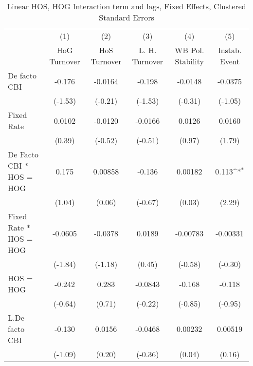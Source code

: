 {
\def\sym#1{\ifmmode^{#1}\else\(^{#1}\)\fi}
\begin{longtable}{l*{5}{c}}
\caption{Linear HOS, HOG Interaction term and lags, Fixed Effects, Clustered Standard Errors \label{hoshogintlagsDF}}\\
\hline\hline\endfirsthead\hline\endhead\hline\endfoot\endlastfoot
                &\multicolumn{1}{c}{(1)}&\multicolumn{1}{c}{(2)}&\multicolumn{1}{c}{(3)}&\multicolumn{1}{c}{(4)}&\multicolumn{1}{c}{(5)}\\
                &\multicolumn{1}{c}{HoG Turnover}&\multicolumn{1}{c}{HoS Turnover}&\multicolumn{1}{c}{L. H. Turnover}&\multicolumn{1}{c}{WB Pol. Stability}&\multicolumn{1}{c}{Instab. Event}\\
\hline
De facto CBI    &   -0.176         &  -0.0164         &   -0.198         &  -0.0148         &  -0.0375         \\
                &  (-1.53)         &  (-0.21)         &  (-1.53)         &  (-0.31)         &  (-1.05)         \\
[1em]
Fixed Rate      &   0.0102         &  -0.0120         &  -0.0166         &   0.0126         &   0.0160         \\
                &   (0.39)         &  (-0.52)         &  (-0.51)         &   (0.97)         &   (1.79)         \\
[1em]
De Facto CBI * HOS = HOG&    0.175         &  0.00858         &   -0.136         &  0.00182         &    0.113\sym{*}  \\
                &   (1.04)         &   (0.06)         &  (-0.67)         &   (0.03)         &   (2.29)         \\
[1em]
Fixed Rate * HOS = HOG&  -0.0605         &  -0.0378         &   0.0189         & -0.00783         & -0.00331         \\
                &  (-1.84)         &  (-1.18)         &   (0.45)         &  (-0.58)         &  (-0.30)         \\
[1em]
HOS = HOG       &   -0.242         &    0.283         &  -0.0843         &   -0.168         &   -0.118         \\
                &  (-0.64)         &   (0.71)         &  (-0.22)         &  (-0.85)         &  (-0.95)         \\
[1em]
L.De facto CBI  &   -0.130         &   0.0156         &  -0.0468         &  0.00232         &  0.00519         \\
                &  (-1.09)         &   (0.20)         &  (-0.36)         &   (0.04)         &   (0.16)         \\

\end{longtable}}
